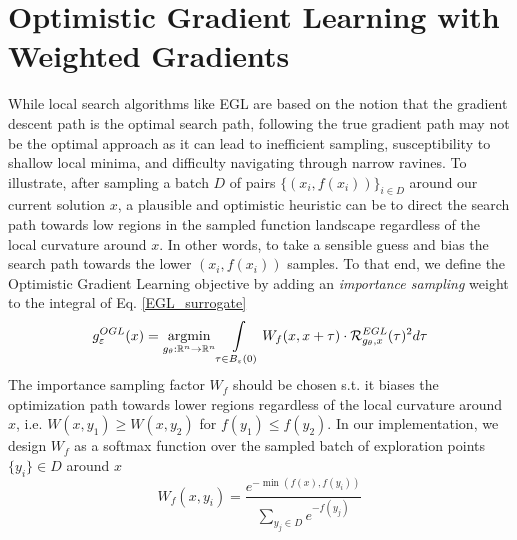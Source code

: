 \section{Optimistic Gradient Learning with Weighted Gradients}
\label{OGL}
While local search algorithms like EGL are based on the notion that the gradient descent path is the optimal search path, following the true gradient path may not be the optimal approach as it can lead to inefficient sampling,  susceptibility to shallow local minima, and difficulty navigating through narrow ravines. To illustrate, after sampling a batch \(D\) of pairs \(\{
(x_i, f(x_i))\}_{i\in D}\) around our current solution \(x\), a plausible and optimistic heuristic can be to direct the search path towards low regions in the sampled function landscape regardless of the local curvature around \(x\). In other words, to take a sensible guess and bias the search path towards the lower \((x_i,f(x_i))\) samples. To that end, we define the Optimistic Gradient Learning objective by adding an \textit{importance sampling} weight to the integral of Eq. \ref{EGL_surrogate}
\begin{equation}
\label{ogl_objective}
 g^{OGL}_{\varepsilon}(x) = \operatorname*{argmin}_{g_{\theta}:\mathbb{R}^n \rightarrow \mathbb{R}^n} \int\limits_{\tau \in B_\varepsilon(0)} W_f(x,x + \tau) \cdot 
    \mathcal{R}_{g_\theta, x}^{EGL}(\tau)^2 d\tau
\end{equation}
The importance sampling factor \(W_f\) should be chosen s.t. it biases the optimization path towards lower regions regardless of the local curvature around \(x\), i.e. $W(x, y_1) \geq W(x, y_2)$ for \(f(y_1) \leq f(y_2)\). In our implementation, we design \(W_f\) as a softmax function over the sampled batch of exploration points $\{y_i\}\in D$ around \(x\)
\begin{equation}
W_f(x,y_i) = \frac{e^{-\min(f(x), f(y_i))}}{\sum_{y_j\in D} e^{-f(y_j)}}
\end{equation}


